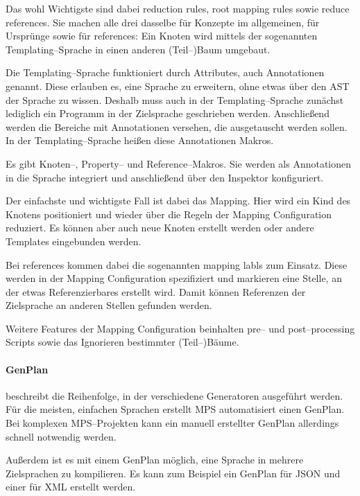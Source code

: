 Das wohl Wichtigste sind dabei {\ttfamily reduction rules}, {\ttfamily root mapping rules} sowie {\ttfamily reduce references}.
Sie machen alle drei dasselbe für Konzepte im allgemeinen, für Ursprünge sowie für {\ttfamily references}: Ein Knoten wird mittels der sogenannten Templating--Sprache in einen anderen (Teil--)Baum umgebaut.

Die Templating--Sprache funktioniert durch Attributes, auch Annotationen genannt.
Diese erlauben es, eine Sprache zu erweitern, ohne etwas über den \ac{AST} der Sprache zu wissen.
Deshalb muss auch in der Templating--Sprache zunächst lediglich ein Programm in der Zielsprache geschrieben werden.
Anschließend werden die Bereiche mit Annotationen versehen, die ausgetauscht werden sollen.
In der Templating--Sprache heißen diese Annotationen Makros.

Es gibt Knoten--, Property-- und Reference--Makros.
Sie werden als Annotationen in die Sprache integriert und anschließend über den Inspektor konfiguriert.

Der einfachste und wichtigste Fall ist dabei das Mapping.
Hier wird ein Kind des Knotens positioniert und wieder über die Regeln der {\ttfamily Mapping Configuration} reduziert.
Es können aber auch neue Knoten erstellt werden oder andere Templates eingebunden werden.

Bei {\ttfamily references} kommen dabei die sogenannten {\ttfamily mapping labls} zum Einsatz.
Diese werden in der {\ttfamily Mapping Configuration} spezifiziert und markieren eine Stelle, an der etwas Referenzierbares erstellt wird.
Damit können Referenzen der Zielsprache an anderen Stellen gefunden werden.

Weitere Features der {\ttfamily Mapping Configuration} beinhalten pre-- und post--processing Scripts sowie das Ignorieren bestimmter (Teil--)Bäume.

\paragraph{GenPlan} beschreibt die Reihenfolge, in der verschiedene Generatoren ausgeführt werden.
Für die meisten, einfachen Sprachen erstellt \ac{MPS} automatisiert einen GenPlan.
Bei komplexen \ac{MPS}--Projekten kann ein manuell erstellter GenPlan allerdings schnell notwendig werden.

Außerdem ist es mit einem GenPlan möglich, eine Sprache in mehrere Zielsprachen zu kompilieren.
Es kann zum Beispiel ein GenPlan für \ac{JSON} und einer für \ac{XML} erstellt werden.

